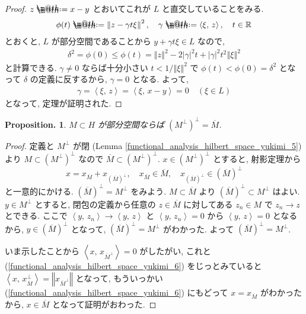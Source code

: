 \documentclass[openany, a4paper, oneside]{jsbook}
\makeatletter
\newcommand*{\defeq}{\mathrel{\rlap{%
\raisebox{0.3ex}{$\m@th\cdot$}}%
\raisebox{-0.3ex}{$\m@th\cdot$}}%
=}
\theoremstyle{break}
\newtheorem{prop}[thm]{Proposition.}
\theoremstyle{breakdefn}
\newcommand{\abs}[1]{\left|#1\right|}
\newcommand{\norm}[1]{\left\Vert#1\right\Vert}
\newcommand{\rbk}[1]{\left (#1\right)}
\newcommand{\bkt}[2]{\left\langle#1,\,#2\right\rangle}
\makeatother
\begin{document}
\begin{proof}
$z \defeq x - y$ とおいてこれが $L$ と直交していることをみる.
\begin{align}
 \phi(t)
 \defeq
 \norm{z - \gamma t \xi}^2, \quad
 \gamma \defeq \bkt{\xi}{z}, \quad
 t\in \mathbb{R}
\end{align}
とおくと, $L$ が部分空間であることから $y + \gamma t\xi \in L$ なので,
\begin{align}
 \delta^2
 =
 \phi (0)
 \leq
 \phi (t)
 =
 \norm{z}^2 - 2 \abs{\gamma}^2 t + \abs{\gamma}^2 t^2 \norm{\xi}^2
\end{align}
と計算できる.
$\gamma \neq 0$ ならば十分小さい $t < 1 / \norm{\xi}^2$ で
$\phi (t) < \phi (0) = \delta^2$ となって $\delta$ の定義に反するから, $\gamma = 0$ となる.
よって,
\begin{align}
 \gamma
 =
 \bkt{\xi}{z}
 =
 \bkt{\xi}{x - y}
 =
 0 \quad \rbk{\xi \in L}
\end{align}
となって, 定理が証明された.
\end{proof}
\begin{prop}\label{functional_analysis_hilbert_space_yukimi_13}
 $M \subset H$ が部分空間ならば $(M^{\perp})^{\perp} = \overline{M}$.
\end{prop}
\begin{proof}
定義と $M^{\perp}$ が閉 (Lemma \ref{functional_analysis_hilbert_space_yukimi_5}) より
$M \subset (M^\perp)^\perp$ なので $\overline{M} \subset (M^\perp)^\perp$.
$x \in (M^\perp)^\perp$ とすると, 射影定理から
\begin{equation}
 x
 =
 x_{\overline{M}} + x_{(\overline{M})^\perp}, \quad
 x_{\overline{M}}\in \overline{M}, \quad
 x_{(\overline{M})^\perp} \in (\overline{M})^\perp \label{functional_analysis_hilbert_space_yukimi_6}
\end{equation}
と一意的にかける.
$(\overline{M})^\perp = M^\perp$ をみよう.
$M \subset \overline{M}$ より $(\overline{M})^\perp \subset M^\perp$ はよい.
$y \in M^\perp$ とすると, 閉包の定義から任意の $z \in \overline{M}$ に対してある
$z_{n} \in M$ で $z_{n} \to z$ とできる.
ここで $\bkt{y}{z_n} \to \bkt{y}{z}$ と $\bkt{y}{z_n} = 0$ から $\bkt{y}{z} = 0$ となるから,
$y \in (\overline{M})^\perp$ となって, $(\overline{M})^\perp = M^\perp$ がわかった.
よって $(\overline{M})^\perp = M^\perp$.

いま示したことから $\bkt{x}{x_{\overline{M}^{\perp}}} = 0$ がしたがい, これと (\ref{functional_analysis_hilbert_space_yukimi_6})
をじっとみていると $\bkt{x}{x_{\overline{M}}^{\perp}} = \norm{x_{\overline{M}^{\perp}}}$ となって,
もういっかい (\ref{functional_analysis_hilbert_space_yukimi_6}) にもどって
$x = x_{\overline{M}}$ がわかったから, $x \in \overline{M}$ となって証明がおわった.
\end{proof}
\end{document}
